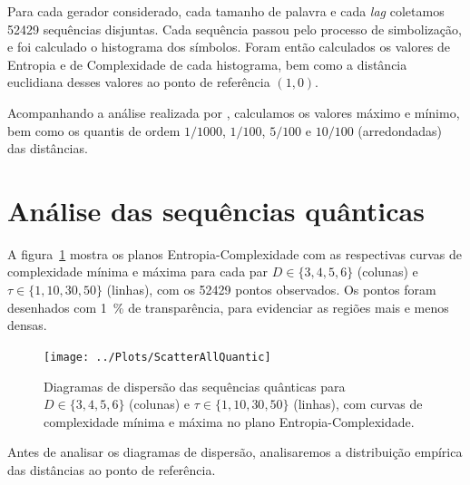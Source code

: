 

\begin{center}
\end{center}

Para cada gerador considerado, cada tamanho de palavra e cada \textit{lag} coletamos \num{52429} sequências disjuntas.
Cada sequência passou pelo processo de simbolização, e foi calculado o histograma dos símbolos.
Foram então calculados os valores de Entropia e de Complexidade de cada histograma, bem como a distância euclidiana desses valores ao ponto de referência $(1,0)$.

Acompanhando a análise realizada por \citet{NewPermutationEntropy}, calculamos os valores máximo e mínimo, bem como os quantis de ordem $1/1000$, $1/100$, $5/100$ e $10/100$ (arredondadas) das distâncias.

\section{Análise das sequências quânticas}

A figura~\ref{Fig:ScatterAllQuantic} mostra os planos Entropia-Complexidade com as respectivas curvas de complexidade mínima e máxima para cada par $D\in\{3,4,5,6\}$ (colunas) e $\tau\in\{1,10,30,50\}$ (linhas), com os \num{52429} pontos observados.
Os pontos foram desenhados com \SI{1}{\percent} de transparência, para evidenciar as regiões mais e menos densas.

\begin{figure}[hbt]
\centering
\texttt{[image: ../Plots/ScatterAllQuantic]}
\caption{Diagramas de dispersão das sequências quânticas para $D\in\{3,4,5,6\}$ (colunas) e $\tau\in\{1,10,30,50\}$ (linhas), com curvas de complexidade mínima e máxima no plano Entropia-Complexidade.}\label{Fig:ScatterAllQuantic}
\end{figure}

Antes de analisar os diagramas de dispersão, analisaremos a distribuição empírica das distâncias ao ponto de referência.

